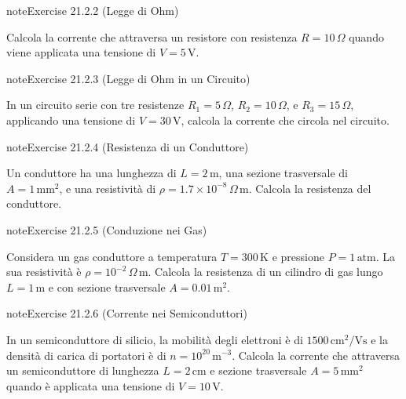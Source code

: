\documentclass[letterpaper,10pt,italian]{jupyterBook}
\begin{document}
\begin{sphinxadmonition}{note}{Exercise 21.2.2 (Legge di Ohm)}



\sphinxAtStartPar
Calcola la corrente che attraversa un resistore con resistenza \(R = 10 \, \Omega\) quando viene applicata una tensione di \(V = 5 \, \text{V}\).
\end{sphinxadmonition}
 \label{exercise:ch/electromagnetism/electric-current-problems-exercise-2}

\begin{sphinxadmonition}{note}{Exercise 21.2.3 (Legge di Ohm in un Circuito)}



\sphinxAtStartPar
In un circuito serie con tre resistenze \(R_1 = 5 \, \Omega\), \(R_2 = 10 \, \Omega\), e \(R_3 = 15 \, \Omega\), applicando una tensione di \(V = 30 \, \text{V}\), calcola la corrente che circola nel circuito.
\end{sphinxadmonition}
 \label{exercise:ch/electromagnetism/electric-current-problems-exercise-3}

\begin{sphinxadmonition}{note}{Exercise 21.2.4 (Resistenza di un Conduttore)}



\sphinxAtStartPar
Un conduttore ha una lunghezza di \(L = 2 \, \text{m}\), una sezione trasversale di \(A = 1 \, \text{mm}^2\), e una resistività di \(\rho = 1.7 \times 10^{-8} \, \Omega \, \text{m}\). Calcola la resistenza del conduttore.
\end{sphinxadmonition}
 \label{exercise:ch/electromagnetism/electric-current-problems-exercise-4}

\begin{sphinxadmonition}{note}{Exercise 21.2.5 (Conduzione nei Gas)}



\sphinxAtStartPar
Considera un gas conduttore a temperatura \(T = 300 \, \text{K}\) e pressione \(P = 1 \, \text{atm}\). La sua resistività è \(\rho = 10^{-2} \, \Omega \, \text{m}\). Calcola la resistenza di un cilindro di gas lungo \(L = 1 \, \text{m}\) e con sezione trasversale \(A = 0.01 \, \text{m}^2\).
\end{sphinxadmonition}
 \label{exercise:ch/electromagnetism/electric-current-problems-exercise-5}

\begin{sphinxadmonition}{note}{Exercise 21.2.6 (Corrente nei Semiconduttori)}



\sphinxAtStartPar
In un semiconduttore di silicio, la mobilità degli elettroni è di \(1500 \, \text{cm}^2/\text{V}\text{s}\) e la densità di carica di portatori è di \(n = 10^{20} \, \text{m}^{-3}\). Calcola la corrente che attraversa un semiconduttore di lunghezza \(L = 2 \, \text{cm}\) e sezione trasversale \(A = 5 \, \text{mm}^2\) quando è applicata una tensione di \(V = 10 \, \text{V}\).
\end{sphinxadmonition}
 \label{exercise:ch/electromagnetism/electric-current-problems-exercise-6}
\end{document}
